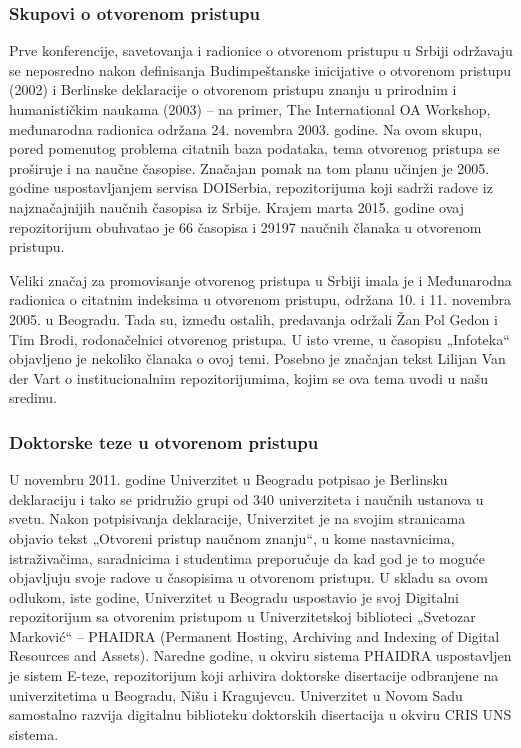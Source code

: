 \documentclass{article}
\begin{document}
\subsubsection{Skupovi o otvorenom pristupu}

Prve konferencije, savetovanja i radionice o otvorenom pristupu u Srbiji održavaju se neposredno nakon definisanja Budimpeštanske inicijative o otvorenom pristupu (2002) i Berlinske deklaracije o otvorenom pristupu znanju u prirodnim i humanističkim naukama (2003) – na primer, The International OA Workshop, međunarodna radionica održana 24. novembra 2003. godine. Na ovom skupu, pored pomenutog problema citatnih baza podataka, tema otvorenog pristupa se proširuje i na naučne časopise. Značajan pomak na tom planu učinjen je 2005. godine uspostavljanjem servisa DOISerbia, repozitorijuma koji sadrži radove iz najznačajnijih naučnih časopisa iz Srbije. Krajem marta 2015. godine ovaj repozitorijum obuhvatao je 66 časopisa i 29197 naučnih članaka u otvorenom pristupu.

Veliki značaj za promovisanje otvorenog pristupa u Srbiji imala je i Međunarodna radionica o citatnim indeksima u otvorenom pristupu, održana 10. i 11. novembra 2005. u Beogradu. Tada su, između ostalih, predavanja održali Žan Pol Gedon i Tim Brodi, rodonačelnici otvorenog pristupa. U isto vreme, u časopisu „Infoteka“ objavljeno je nekoliko članaka o ovoj temi. Posebno je značajan tekst Lilijan Van der Vart o institucionalnim repozitorijumima, kojim se ova tema uvodi u našu sredinu.

\subsubsection{Doktorske teze u otvorenom pristupu}

U novembru 2011. godine Univerzitet u Beogradu potpisao je Berlinsku deklaraciju i tako se pridružio grupi od 340 univerziteta i naučnih ustanova u svetu. Nakon potpisivanja deklaracije, Univerzitet je na svojim stranicama objavio tekst „Otvoreni pristup naučnom znanju“, u kome nastavnicima, istraživačima, saradnicima i studentima preporučuje da kad god je to moguće objavljuju svoje radove u časopisima u otvorenom pristupu. U skladu sa ovom odlukom, iste godine, Univerzitet u Beogradu uspostavio je svoj Digitalni repozitorijum sa otvorenim pristupom u Univerzitetskoj biblioteci „Svetozar Marković“ – PHAIDRA (Permanent Hosting, Archiving and Indexing of Digital Resources and Assets). Naredne godine, u okviru sistema PHAIDRA uspostavljen je sistem E-teze, repozitorijum koji arhivira doktorske disertacije odbranjene na univerzitetima u Beogradu, Nišu i Kragujevcu. Univerzitet u Novom Sadu samostalno razvija digitalnu biblioteku doktorskih disertacija u okviru CRIS UNS sistema.
\end{document}
